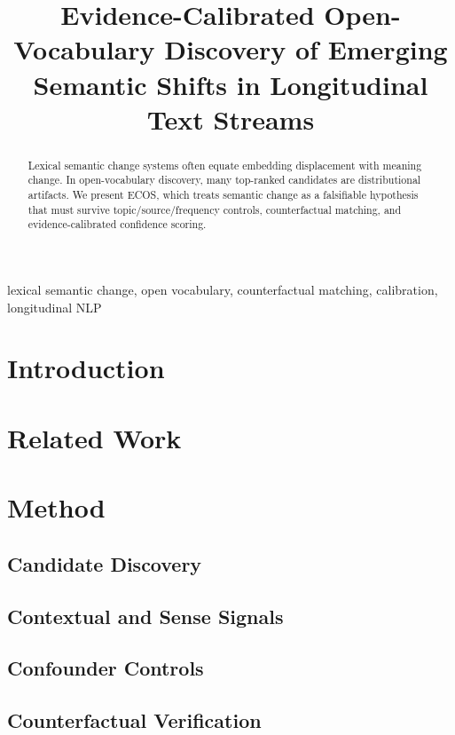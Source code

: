 \documentclass[conference]{IEEEtran}
\title{Evidence-Calibrated Open-Vocabulary Discovery of Emerging Semantic Shifts in Longitudinal Text Streams}
\author{
\IEEEauthorblockN{Anonymous Authors}
\IEEEauthorblockA{Affiliation TBD}
}
\begin{document}
\maketitle

\begin{abstract}
Lexical semantic change systems often equate embedding displacement with meaning change.
In open-vocabulary discovery, many top-ranked candidates are distributional artifacts.
We present ECOS, which treats semantic change as a falsifiable hypothesis that must survive
topic/source/frequency controls, counterfactual matching, and evidence-calibrated confidence scoring.
\end{abstract}

\begin{IEEEkeywords}
lexical semantic change, open vocabulary, counterfactual matching, calibration, longitudinal NLP
\end{IEEEkeywords}

\section{Introduction}

\section{Related Work}

\section{Method}
\subsection{Candidate Discovery}
\subsection{Contextual and Sense Signals}
\subsection{Confounder Controls}
\subsection{Counterfactual Verification}
\end{document}
